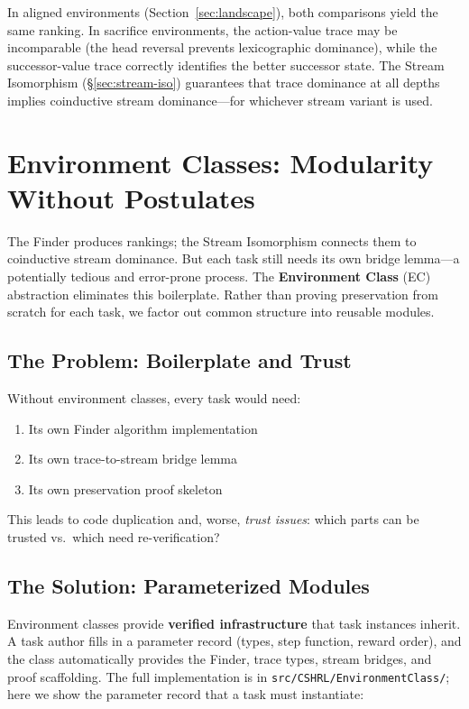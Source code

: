 \documentclass[9pt,a4paper]{article}
\newcommand{\fpath}[1]{\nolinkurl{#1}}
\theoremstyle{plain}
\theoremstyle{definition}
\theoremstyle{remark}
\begin{document}
In aligned environments (Section~\ref{sec:landscape}), both comparisons yield the same ranking.  In sacrifice environments, the action-value trace may be incomparable (the head reversal prevents lexicographic dominance), while the successor-value trace correctly identifies the better successor state.  The Stream Isomorphism (\S\ref{sec:stream-iso}) guarantees that trace dominance at all depths implies coinductive stream dominance---for whichever stream variant is used.

\section{Environment Classes: Modularity Without Postulates}\label{sec:env-classes}

The Finder produces rankings; the Stream Isomorphism connects them to coinductive stream dominance.  But each task still needs its own bridge lemma---a potentially tedious and error-prone process.  The \textbf{Environment Class} (EC) abstraction eliminates this boilerplate.  Rather than proving preservation from scratch for each task, we factor out common structure into reusable modules.

\subsection{The Problem: Boilerplate and Trust}

Without environment classes, every task would need:
\begin{enumerate}
\item Its own Finder algorithm implementation
\item Its own trace-to-stream bridge lemma
\item Its own preservation proof skeleton
\end{enumerate}

This leads to code duplication and, worse, \emph{trust issues}: which parts can be trusted vs.\ which need re-verification?

\subsection{The Solution: Parameterized Modules}

Environment classes provide \textbf{verified infrastructure} that task instances inherit.  A task author fills in a parameter record (types, step function, reward order), and the class automatically provides the Finder, trace types, stream bridges, and proof scaffolding.  The full implementation is in \fpath{src/CSHRL/EnvironmentClass/}; here we show the parameter record that a task must instantiate:
\end{document}
